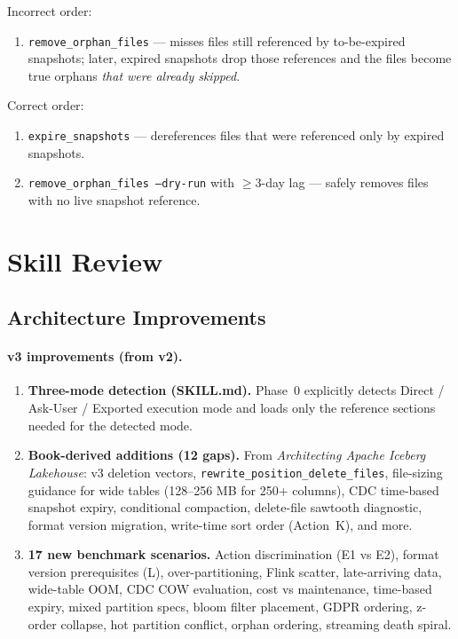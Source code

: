 \documentclass[11pt,a4paper]{article}
\newcommand{\code}[1]{\texttt{#1}}
\begin{document}
Incorrect order:
\begin{enumerate}
  \item \code{remove\_orphan\_files} --- misses files still referenced by
        to-be-expired snapshots; later, expired snapshots drop those references
        and the files become true orphans \emph{that were already skipped}.
\end{enumerate}

Correct order:
\begin{enumerate}
  \item \code{expire\_snapshots} --- dereferences files that were referenced
        only by expired snapshots.
  \item \code{remove\_orphan\_files --dry-run} with $\geq$3-day lag --- safely
        removes files with no live snapshot reference.
\end{enumerate}

\section{Skill Review}
\label{sec:skill-review}

\subsection{Architecture Improvements}

\paragraph{v3 improvements (from v2).}
\begin{enumerate}
  \item \textbf{Three-mode detection (SKILL.md).}  Phase~0 explicitly detects
        Direct / Ask-User / Exported execution mode and loads only the reference
        sections needed for the detected mode.

  \item \textbf{Book-derived additions (12 gaps).}  From
        \emph{Architecting Apache Iceberg Lakehouse}: v3 deletion vectors,
        \code{rewrite\_position\_delete\_files}, file-sizing guidance for wide
        tables (128--256 MB for 250+ columns), CDC time-based snapshot expiry,
        conditional compaction, delete-file sawtooth diagnostic, format version
        migration, write-time sort order (Action~K), and more.

  \item \textbf{17 new benchmark scenarios.}  Action discrimination (E1 vs E2),
        format version prerequisites (L), over-partitioning, Flink scatter,
        late-arriving data, wide-table OOM, CDC COW evaluation, cost vs
        maintenance, time-based expiry, mixed partition specs, bloom filter
        placement, GDPR ordering, z-order collapse, hot partition conflict,
        orphan ordering, streaming death spiral.
\end{enumerate}
\end{document}
